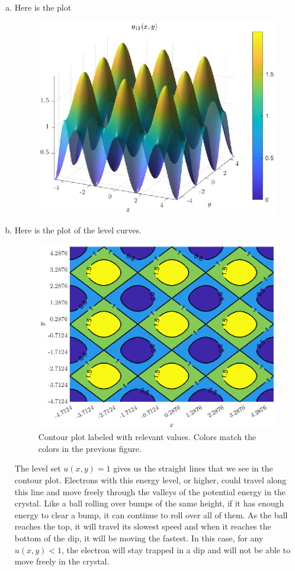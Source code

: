 \documentclass[12pt]{article} %
\begin{document}
\begin{solution}~
\begin{enumerate}[(a)]
    \item Here is the plot
    \begin{figure}[H]
        \centering
	\includegraphics[width=.75\textwidth]{figures/crystal_surface}
    \end{figure}
    \item Here is the plot of the level curves.
    \begin{figure}[H]
        \centering
	   \includegraphics[width=.75\columnwidth]{figures/crystal_level_curves}
        \caption{Contour plot labeled with relevant values. Colors match the colors in the previous figure.}
    \end{figure}
    The level set $u(x,y)=1$ gives us the straight lines that we see in the contour plot. Electrons with this energy level, or higher, could travel along this line and move freely through the valleys of the potential energy in the crystal. Like a ball rolling over bumps of the same height, if it has enough energy to clear a bump, it can continue to roll over all of them. As the ball reaches the top, it will travel its slowest speed and when it reaches the bottom of the dip, it will be moving the fastest. In this case, for any $u(x,y)<1$, the electron will stay trapped in a dip and will not be able to move freely in the crystal.


\end{enumerate}
\end{solution}
\end{document}
